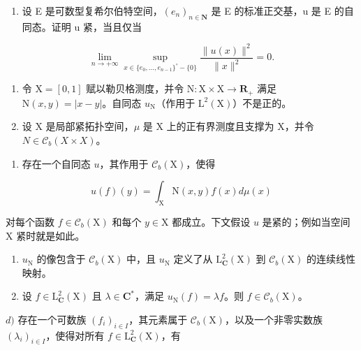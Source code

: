 \begin{enumerate}
\def\labelenumi{\arabic{enumi})}
\setcounter{enumi}{12}
\tightlist
\item
  设 E 是可数型复希尔伯特空间，\((e_{n})_{n\in\mathbf{N}}\) 是 E 的标准正交基，u 是 E 的自同态。证明 u 紧，当且仅当
\end{enumerate}

\[
\lim _ {n \to + \infty} \sup _ {x \in \{e _ {0}, \dots , e _ {n - 1} \} ^ {\circ} - \{0 \}} \frac {\| u (x) \| ^ {2}}{\| x \| ^ {2}} = 0.
\]

\begin{enumerate}
\def\labelenumi{\arabic{enumi})}
\setcounter{enumi}{13}
\item
  令 \(\mathrm{X} = [0,1]\) 赋以勒贝格测度，并令 \(\mathrm{N}\colon \mathrm{X}\times \mathrm{X}\to \mathbf{R}_{+}\) 满足 \(\mathrm{N}(x,y) = |x - y|\)。自同态 \(u_{\mathrm{N}}\)（作用于 \(\mathrm{L}^2 (\mathrm{X})\)）不是正的。
\item
  设 X 是局部紧拓扑空间，\(\mu\) 是 X 上的正有界测度且支撑为 X，并令 \(N \in \mathcal{C}_{b}(X \times X)\)。
\end{enumerate}

\begin{enumerate}
\def\labelenumi{\alph{enumi})}
\tightlist
\item
  存在一个自同态 \(u\)，其作用于 \(\mathcal{C}_b(\mathrm{X})\)，使得
\end{enumerate}

\[
u (f) (y) = \int_ {\mathrm{X}} \mathrm{N} (x, y) f (x) d \mu (x)
\]

对每个函数 \(f \in \mathcal{C}_b(\mathrm{X})\) 和每个 \(y \in \mathrm{X}\) 都成立。下文假设 \(u\) 是紧的；例如当空间 \(\mathrm{X}\) 紧时就是如此。

\begin{enumerate}
\def\labelenumi{\alph{enumi})}
\setcounter{enumi}{1}
\item
  \(u_{\mathrm{N}}\) 的像包含于 \(\mathcal{C}_b(\mathrm{X})\) 中，且 \(u_{\mathrm{N}}\) 定义了从 \(\mathrm{L}_{\mathbf{C}}^{2}(\mathrm{X})\) 到 \(\mathcal{C}_b(\mathrm{X})\) 的连续线性映射。
\item
  设 \(f \in \mathrm{L}_{\mathbf{C}}^{2}(\mathrm{X})\) 且 \(\lambda \in \mathbf{C}^*\)，满足 \(u_{\mathrm{N}}(f) = \lambda f\)。则 \(f \in \mathcal{C}_b(\mathrm{X})\)。
\end{enumerate}

\(d)\) 存在一个可数族 \((f_i)_{i\in I}\)，其元素属于 \(\mathcal{C}_b(\mathrm{X})\)，以及一个非零实数族 \((\lambda_i)_{i\in I}\)，使得对所有 \(f\in \mathrm{L}_{\mathbf{C}}^2 (\mathrm{X})\)，有

